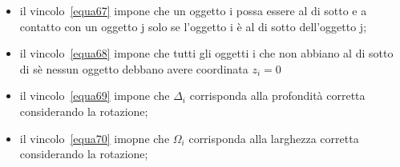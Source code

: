 \begin{itemize}
	\item il vincolo~\eqref{equa67} impone che un oggetto i possa essere al di sotto e a contatto con un oggetto j solo se l'oggetto i è al di sotto dell'oggetto j;
	\item il vincolo~\eqref{equa68} impone che tutti gli oggetti i che non abbiano al di sotto di sè nessun oggetto debbano avere coordinata $z_i=0$
	\item il vincolo~\eqref{equa69} impone che $\Delta_i$ corrisponda alla profondità corretta considerando la rotazione;
	\item il vincolo~\eqref{equa70} imopne che $\Omega_i$ corrisponda alla larghezza corretta considerando la rotazione;
\end{itemize}

